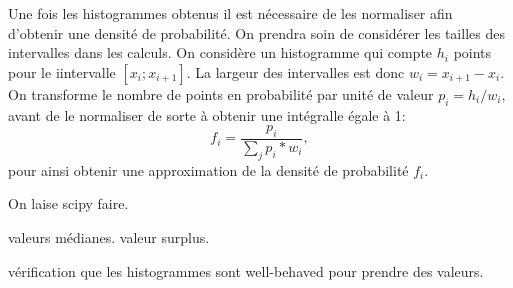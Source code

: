\documentclass[index]{subfiles}
\begin{document}
Une fois les histogrammes obtenus il est nécessaire de les normaliser afin d'obtenir une densité de probabilité. On prendra soin de considérer les tailles des intervalles dans les calculs.
On considère un histogramme qui compte \(h_{i}\) points pour le i\ieme intervalle \(\left[x_{i}; x_{i+1} \right]\).
La largeur des intervalles est donc \(w_{i} = x_{i+1}-x_{i}\). On transforme le nombre de points en probabilité par unité de valeur \(p_{i} = h_{i} / w_{i} \), avant de le normaliser de sorte à obtenir une intégralle égale à 1:
\begin{equation}
  f_{i} = \frac{p_{i}}{\sum_{j}{p_{i}*w_{i}}},
\end{equation}
pour ainsi obtenir une approximation de la densité de probabilité \(f_{i}\).

On laise scipy faire.

valeurs médianes.
valeur surplus.

vérification que les histogrammes sont well-behaved pour prendre des valeurs.

\biblio
\end{document}
